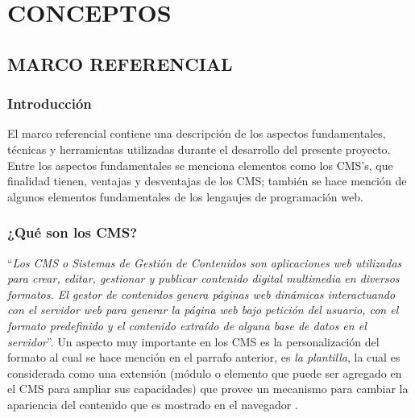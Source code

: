 \part{CONCEPTOS}

\chapter{MARCO REFERENCIAL}
\newpage

\section{Introducci\'on}
El marco referencial contiene una descripci\'on de los aspectos fundamentales, t\'ecnicas y herramientas utilizadas durante el desarrollo del presente proyecto.\\
Entre los aspectos fundamentales se menciona elementos como los CMS's, que finalidad tienen, ventajas y desventajas de los CMS; tambi\'en se hace menci\'on de algunos elementos fundamentales de los lengaujes de programaci\'on web.

\section{¿Qu\'e son los CMS?}
``\textit{Los CMS o Sistemas de Gesti\'on de Contenidos son aplicaciones web utilizadas para crear, editar, gestionar y publicar contenido digital multimedia en diversos formatos. El gestor de contenidos genera p\'aginas web din\'amicas interactuando con el servidor web para generar la p\'agina web bajo petici\'on del usuario, con el formato predefinido y el contenido extra\'ido de alguna base de datos en el servidor}''.
Un aspecto muy importante en los CMS es la personalizaci\'on del formato al cual se hace menci\'on en el parrafo anterior, es \textit{la plantilla}, la cual es considerada como una extensi\'on (m\'odulo o elemento que puede ser agregado en el CMS para ampliar sus capacidades) que provee un mecanismo para cambiar la apariencia del contenido que es mostrado en el navegador \cite{what_is_a_cms}.

